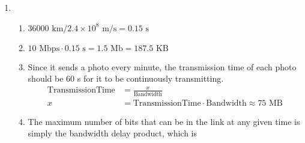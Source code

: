 \documentclass{article}
\begin{document}
\begin{enumerate}
\begin{enumerate}
        \end{enumerate}

        \newpage
        \item 
        \begin{enumerate}
            \item $36000 \text{ km} / 2.4 \times 10^8 \text{ m/s}  = \boxed{0.15 \text{ s}}$
            \item $10 \text{ Mbps} \cdot 0.15 \text{ s} = 1.5 \text{ Mb} = \boxed{187.5 \text{ KB}}$
            \item Since it sends a photo every minute, the transmission time of each photo 
            should be 60 s for it to be continuously transmitting. 
            \begin{align*}
                \text{TransmissionTime} &= \frac{x}{\text{Bandwidth}}\\
                x &= \text{TransmissionTime} \cdot \text{Bandwidth} \approx \boxed{75 \text{ MB}}
            \end{align*}
            \item The maximum number of bits that can be in the link at any given time is 
            simply the bandwidth delay product, which is 
        \end{enumerate}
    \end{enumerate}
\end{document}
